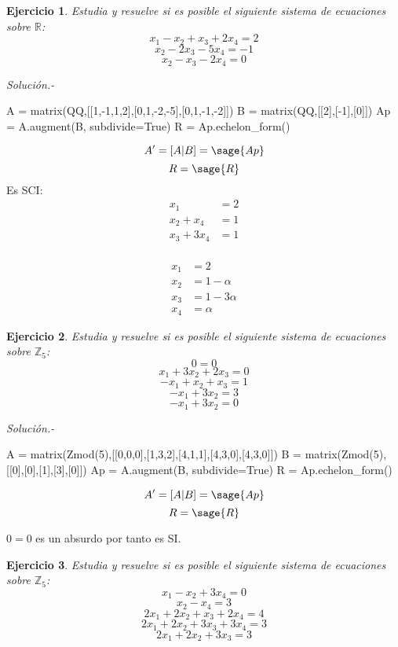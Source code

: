 \documentclass{amsart}
\newtheorem{ejer}{Ejercicio}
\def\r{\mathbb{R}}
\def\z{\mathbb{Z}}
\begin{document}

\begin{ejer} Estudia y resuelve si es posible el siguiente sistema de ecuaciones sobre $\r $:
\[ x_{1} - x_{2} + x_{3} + 2 x_{4} = 2 \]
\[ x_{2} - 2 x_{3} - 5 x_{4} = -1 \]
\[ x_{2} - x_{3} - 2 x_{4} = 0 \]
\end{ejer}

{\it Soluci\'on.-}

\begin{sageblock}
A = matrix(QQ,[[1,-1,1,2],[0,1,-2,-5],[0,1,-1,-2]])
B = matrix(QQ,[[2],[-1],[0]])
Ap = A.augment(B, subdivide=True)
R = Ap.echelon_form()
\end{sageblock}

$$
A' = [A|B] = \sage{Ap}
$$
$$
R = \sage{R}
$$
Es SCI:
\begin{align*}
	x_1 &= 2 \\
	x_2 + x_4   &= 1 \\
	x_3 + 3 x_4 &= 1 \\
\end{align*}

\begin{align*}
	x_1 &= 2 \\
	x_2 &= 1 - \alpha \\
	x_3 &= 1 - 3 \alpha \\
	x_4 &= \alpha
\end{align*}



\begin{ejer} Estudia y resuelve si es posible el siguiente sistema de ecuaciones sobre $\z _5$:
\[ 0 = 0 \]
\[ x_{1} + 3 x_{2} + 2 x_{3} = 0 \]
\[ -x_{1} + x_{2} + x_{3} = 1 \]
\[ -x_{1} + 3 x_{2} = 3 \]
\[ -x_{1} + 3 x_{2} = 0 \]
\end{ejer}

{\it Soluci\'on.- }


\begin{sageblock}
A = matrix(Zmod(5),[[0,0,0],[1,3,2],[4,1,1],[4,3,0],[4,3,0]])
B = matrix(Zmod(5),[[0],[0],[1],[3],[0]])
Ap = A.augment(B, subdivide=True)
R = Ap.echelon_form()
\end{sageblock}

$$
A' = [A|B] = \sage{Ap}
$$
$$
R = \sage{R}
$$

$0=0$ es un absurdo por tanto es SI.

\begin{ejer} Estudia y resuelve si es posible el siguiente sistema de ecuaciones sobre $\z _5$:
\[ x_{1} - x_{2} + 3 x_{4} = 0 \]
\[ x_{2} - x_{4} = 3 \]
\[ 2 x_{1} + 2 x_{2} + x_{3} + 2 x_{4} = 4 \]
\[ 2 x_{1} + 2 x_{2} + 3 x_{3} + 3 x_{4} = 3 \]
\[ 2 x_{1} + 2 x_{2} + 3 x_{3} = 3 \]
\end{ejer}
\end{document}
